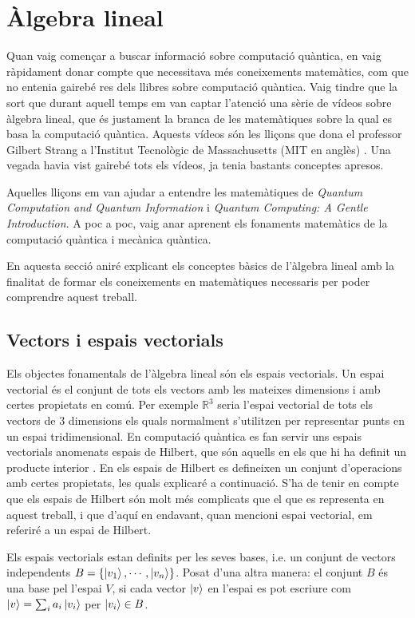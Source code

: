 \chapter{Àlgebra lineal}\label{algebra}
Quan vaig començar a buscar informació sobre computació quàntica, en vaig ràpidament donar compte que necessitava més coneixements matemàtics, com que no entenia gairebé res dels llibres sobre computació quàntica. Vaig tindre que la sort que durant aquell temps em van captar l'atenció una sèrie de vídeos sobre àlgebra lineal, que és justament la branca de les matemàtiques sobre la qual es basa la computació quàntica. Aquests vídeos són les lliçons que dona el professor Gilbert Strang a l'Institut Tecnològic de Massachusetts (MIT en anglès) \cite{LA_OCW_strang, LA2_OCW_strang}. Una vegada havia vist gairebé tots els vídeos, ja tenia bastants conceptes apresos.

Aquelles lliçons em van ajudar a entendre les matemàtiques de \textit{Quantum Computation and Quantum Information} \cite{QCandQI} i \textit{Quantum Computing: A Gentle Introduction}. A poc a poc, vaig anar aprenent els fonaments matemàtics de la computació quàntica i mecànica quàntica.

En aquesta secció aniré explicant els conceptes bàsics de l'àlgebra lineal amb la finalitat de formar els coneixements en matemàtiques necessaris per poder comprendre aquest treball.

\section{Vectors i espais vectorials}
Els objectes fonamentals de l'àlgebra lineal són els espais vectorials. Un espai vectorial és el conjunt de tots els vectors amb les mateixes dimensions i amb certes propietats en comú. Per exemple $\mathbb{R}^{3}$ seria l'espai vectorial de tots els vectors de 3 dimensions els quals normalment s'utilitzen per representar punts en un espai tridimensional. En computació quàntica es fan servir uns espais vectorials anomenats espais de Hilbert, que són aquells en els que hi ha definit un producte interior \cite{QCandQI:GramSchmidt}. En els espais de Hilbert es defineixen un conjunt d'operacions amb certes propietats, les quals explicaré a continuació. S'ha de tenir en compte que els espais de Hilbert són molt més complicats que el que es representa en aquest treball, i que d'aquí en endavant, quan mencioni espai vectorial, em referiré a un espai de Hilbert.

Els espais vectorials estan definits per les seves bases, i.e. un conjunt de vectors independents $B = \{\ket{v_1}, \cdots, \ket{v_n}\}$. Posat d'una altra manera: el conjunt $B$ és una base pel l'espai $V$, si cada vector $\ket{v}$ en l'espai es pot escriure com $\ket{v} = \sum_i a_i \ket{v_i}$ per $\ket{v_i} \in B$.

